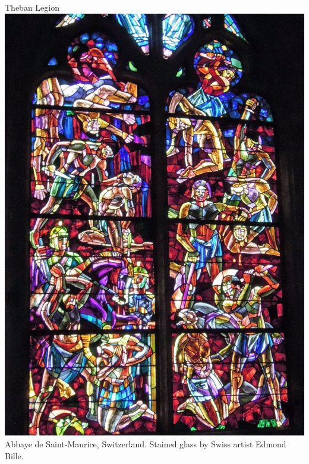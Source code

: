 \begin{frame}{Theban Legion}
    \centering
    \includegraphics[height=0.7\textheight]{img/theban-1.jpg} \\
    Abbaye de Saint-Maurice, Switzerland. Stained glass by Swiss artist Edmond Bille. \\
\end{frame}

